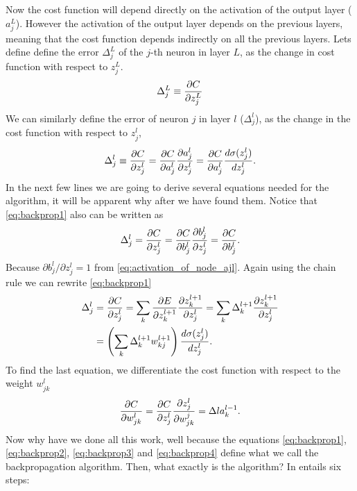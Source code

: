 \documentclass[12pt]{extarticle}
\begin{document}
Now the cost function will depend directly on the activation of the output layer ($a^L_j$). However the activation of the output layer depends on the previous layers, meaning that the cost function depends indirectly on all the previous layers. Lets define define the error $\Delta_j^L$ of the $j$-th neuron in layer $L$, as the change in cost function with respect to $z^L_j$.
\begin{align}
	\Delta_j^L \equiv \frac{\partial C}{\partial z_j^L}
	\label{eq:backprop0}
\end{align}
We can similarly define the error of neuron $j$ in layer $l$ ($\Delta_j^l$), as the change in the cost function with respect to $z_j^l$,
\begin{align}
	\Delta_j^l \equiv \frac{\partial C}{\partial z_j^l} = \frac{\partial C}{\partial a_j^l}\frac{\partial a_j^l}{\partial z^l_j} = \frac{\partial C}{\partial a_j^l}\frac{d \sigma(z^l_j)}{d z^l_j}.
	\label{eq:backprop1}
\end{align}
In the next few lines we are going to derive several equations needed for the algorithm, it will be apparent why after we have found them. Notice that \eqref{eq:backprop1} also can be written as
\begin{align}
	\Delta_j^l = \frac{\partial C}{\partial z_j^l} = \frac{\partial C}{\partial b_j^l}\frac{\partial b_j^l}{\partial z^l_j} = \frac{\partial C}{\partial b_j^l}.
	\label{eq:backprop2}
\end{align}
Because $\partial b_j^l/\partial z^l_j = 1$ from \eqref{eq:activation_of_node_ajl}. Again using the chain rule we can rewrite \eqref{eq:backprop1}
\begin{align}
	\Delta_j^l &= \frac{\partial C}{\partial z_j^l} = \sum_{k} \frac{\partial E}{\partial z_k^{l+1}}\frac{\partial z_k^{l+1}}{\partial z^l_j} = \sum_{k} \Delta_k^{l+1}\frac{\partial z_k^{l+1}}{\partial z^l_j} \nonumber \\
	 &= \left(\sum_{k} \Delta_k^{l+1} w_{kj}^{l+1}\right)\frac{d \sigma(z^l_j)}{d z^l_j}.
	 \label{eq:backprop3}
\end{align}
To find the last equation, we differentiate the cost function with respect to the weight $w^l_{jk}$
\begin{align}
	\frac{\partial C}{\partial w_{jk}^l} = \frac{\partial C}{\partial z_j^l}\frac{\partial z_j^l}{\partial w_{jk}^j} = \Delta l a_k^{l-1}.
	\label{eq:backprop4}
\end{align}
Now why have we done all this work, well because the equations \eqref{eq:backprop1}, \eqref{eq:backprop2}, \eqref{eq:backprop3} and \eqref{eq:backprop4} define what we call the backpropagation algorithm. Then, what exactly is the algorithm? In entails six steps:
\end{document}

